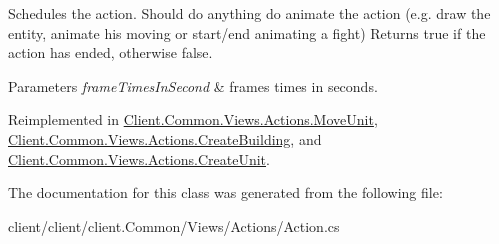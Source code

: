 Schedules the action. Should do anything do animate the action (e.\-g. draw the entity, animate his moving or start/end animating a fight) Returns true if the action has ended, otherwise false. 


\begin{DoxyParams}{Parameters}
{\em frame\-Times\-In\-Second} & frames times in seconds.\\
\hline
\end{DoxyParams}


Reimplemented in \hyperlink{classClient_1_1Common_1_1Views_1_1Actions_1_1MoveUnit_a320dbf0d26ea3e24cfe87eedb61a2e22}{Client.\-Common.\-Views.\-Actions.\-Move\-Unit}, \hyperlink{classClient_1_1Common_1_1Views_1_1Actions_1_1CreateBuilding_a9124e0ed7b33ef3b674613b9dbda626f}{Client.\-Common.\-Views.\-Actions.\-Create\-Building}, and \hyperlink{classClient_1_1Common_1_1Views_1_1Actions_1_1CreateUnit_a3b0aeac3eabb7b10b3f8fb287bc96181}{Client.\-Common.\-Views.\-Actions.\-Create\-Unit}.



The documentation for this class was generated from the following file\-:\begin{DoxyCompactItemize}
\item 
client/client/client.\-Common/\-Views/\-Actions/Action.\-cs\end{DoxyCompactItemize}
